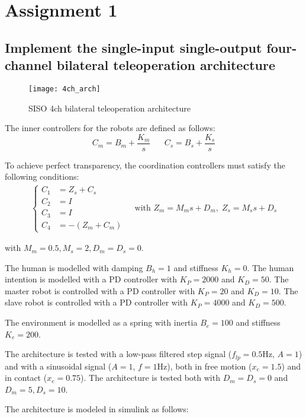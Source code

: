 \section{Assignment 1}

\subsection{Implement the single-input single-output four-channel bilateral teleoperation architecture}

\begin{figure}[h]
\centering
\texttt{[image: 4ch\_arch]}
\caption{SISO 4ch bilateral teleoperation architecture}
\end{figure}

The inner controllers for the robots are defined as follows:
\begin{equation*}
C_m=B_m+\frac{K_m}{s}\;\;\;\;\;\;C_s=B_s+\frac{K_s}{s}
\end{equation*}

To achieve perfect transparency, the coordination controllers must satisfy the following conditions:
\begin{align*}
\begin{cases}
C_1&=Z_s+C_s\\
C_2&=I\\
C_3&=I\\
C_4&=-(Z_m+C_m)
\end{cases}\;\;\;\;\text{with }Z_m=M_ms+D_m,\;Z_s=M_ss+D_s
\end{align*}

with $M_m=0.5,M_s=2,D_m=D_s=0$.

The human is modelled  with damping $B_h=1$ and stiffness $K_h=0$. The human intention is modelled with a PD controller with $K_P=2000$ and $K_D=50$. The master robot is controlled with a PD controller with $K_P=20$ and $K_D=10$. The slave robot is controlled with a PD controller with $K_P=4000$ and $K_D=500$.

The environment is modelled as a spring with  inertia $B_e=100$ and stiffness $K_e=200$.

The architecture is tested with a low-pass filtered step signal ($f_{lp}=0.5$Hz, $A=1$) and with a sinusoidal signal ($A=1$, $f=1$Hz), both in free motion ($x_e = 1.5$) and in contact ($x_e = 0.75$). The architecture is tested both with $D_m=D_s=0$ and $D_m=5,D_s=10$.

The architecture is modeled in simulink as follows:

